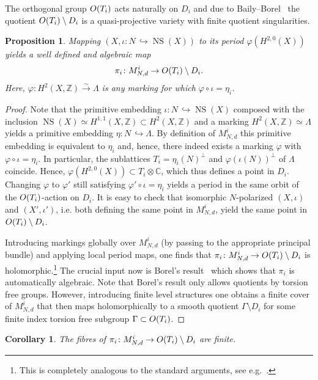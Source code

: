 \documentclass[11pt]{article}
\makeatletter
\newtheorem{prop}[theo]{Proposition}
\newtheorem{coro}[theo]{Corollary}
\theoremstyle{definition}
\numberwithin{equation}{section}
\numberwithin{figure}{section}
\numberwithin{table}{section}
\DeclareMathOperator{\NS}{NS}
\newcommand{\OO}{{\rm O}}
\newcommand{\ZZ}{\mathbb{Z}}
\newcommand{\CC}{\mathbb{C}}
\newcommand{\congpf}{\overset{\sim}{\rightarrow}}%
\renewcommand{\cong}{\simeq}
\makeatother
\begin{document}
The orthogonal group $\OO(T_i)$ acts naturally on $D_i$ and due to Baily--Borel~\cite{BB} the quotient $\OO(T_i)\setminus D_i$ is a quasi-projective variety with finite quotient singularities.

\begin{prop}
Mapping $(X,\iota\colon N\,\hookrightarrow \NS(X))$ to its period $\varphi(H^{2,0}(X))$ yields a well defined and algebraic map
\[
\pi_i\colon M^i_{N,d}\to \OO(T_i)\setminus D_i.
\]
Here, $\varphi\colon H^2(X,\ZZ)\congpf \Lambda$ is any marking for which $\varphi\circ\iota=\eta_i$.
\end{prop}

\begin{proof}
Note that the primitive embedding $\iota\colon N\,\hookrightarrow \NS(X)$ composed with the inclusion $\NS(X)\cong H^{1,1}(X,\ZZ)\subset H^2(X,\ZZ)$ and a marking $ H^2(X,\ZZ)\cong\Lambda$ yields a primitive embedding $\eta\colon N\,\hookrightarrow \Lambda$. By definition of $M^i_{N,d}$ this primitive embedding is equivalent to $\eta_i$ and, hence, there indeed exists a marking $\varphi$ with $\varphi\circ\iota=\eta_i$. In particular, the sublattices $T_i=\eta_i(N)^\perp$ and $\varphi(\iota(N))^\perp$ of $\Lambda$ coincide. Hence, $\varphi(H^{2,0}(X))\subset T_i\otimes \CC$, which thus defines a point in $D_i$. Changing $\varphi$ to $\varphi'$ still satisfying $\varphi'\circ\iota=\eta_i$ yields a period in the same orbit of the $\OO(T_i)$-action on $D_i$. It is easy to check that isomorphic $N$-polarized $(X,\iota)$ and $(X',\iota')$, i.e. both defining the same point in $M^i_{N,d}$, yield the same point in $\OO(T_i)\setminus D_i$.

Introducing markings globally over $M^i_{N,d}$ (by passing to the appropriate principal bundle) and applying local period maps, one finds that $\pi_i\colon M^i_{N,d}\to \OO(T_i)\setminus D_i$ is holomorphic.\footnote{This is completely analogous to the standard arguments, see e.g.~\cite{Beauv,Dolg,HuyK3}.} The crucial input now is Borel's result~\cite{Bor} which shows that $\pi_ i$ is automatically algebraic. Note that Borel's result only allows quotients by torsion free groups. However, introducing finite level structures one obtains a finite cover of $M^i_{N,d}$ that then maps holomorphically to a smooth quotient $\Gamma\setminus D_i$ for some finite index torsion free subgroup $\Gamma\subset \OO(T_i)$.
\end{proof}

\begin{coro}\label{cor:finitefibre}
The fibres of $\pi_i\colon M^i_{N,d}\to \OO(T_i)\setminus D_i$ are finite.
\end{coro}
\end{document}
